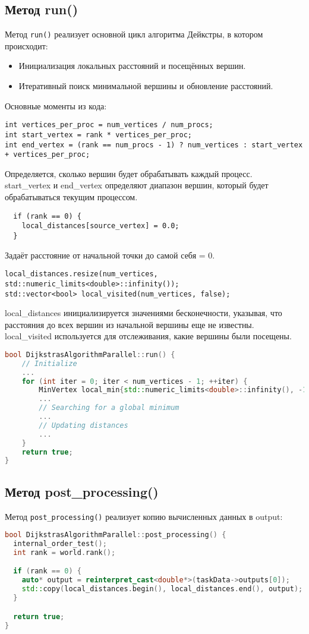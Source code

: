 \documentclass[12pt]{article}
\begin{document}
\subsection{Метод run()}
Метод \texttt{run()} реализует основной цикл алгоритма Дейкстры, в котором происходит:
\begin{itemize}
    \item Инициализация локальных расстояний и посещённых вершин.
    \item Итеративный поиск минимальной вершины и обновление расстояний.
\end{itemize}
Основные моменты из кода:
\begin{lstlisting}
int vertices_per_proc = num_vertices / num_procs;
int start_vertex = rank * vertices_per_proc;
int end_vertex = (rank == num_procs - 1) ? num_vertices : start_vertex + vertices_per_proc;
\end{lstlisting}
Определяется, сколько вершин будет обрабатывать каждый процесс.\\
start\_vertex и end\_vertex определяют диапазон вершин, который будет обрабатываться текущим процессом.
\begin{lstlisting}
  if (rank == 0) {
    local_distances[source_vertex] = 0.0;
  }
\end{lstlisting}
Задаёт расстояние от начальной точки до самой себя = 0.
\begin{lstlisting}
local_distances.resize(num_vertices, std::numeric_limits<double>::infinity());
std::vector<bool> local_visited(num_vertices, false);
\end{lstlisting}
local\_distances инициализируется значениями бесконечности, указывая, что расстояния до всех вершин из начальной вершины еще не известны.\\
local\_visited используется для отслеживания, какие вершины были посещены.
\begin{lstlisting}[language=c++, caption={Основной цикл, где происходит поиск минимума}]
bool DijkstrasAlgorithmParallel::run() {
    // Initialize
    ...
    for (int iter = 0; iter < num_vertices - 1; ++iter) {
        MinVertex local_min{std::numeric_limits<double>::infinity(), -1};
        ...
        // Searching for a global minimum
        ...
        // Updating distances
        ...
    }
    return true;
}
\end{lstlisting}
\subsection{Метод post\_processing()}
Метод \texttt{post\_processing()} реализует копию вычисленных данных в output:
\begin{lstlisting}[language=c++, caption={Сам метод}]
bool DijkstrasAlgorithmParallel::post_processing() {
  internal_order_test();
  int rank = world.rank();

  if (rank == 0) {
    auto* output = reinterpret_cast<double*>(taskData->outputs[0]);
    std::copy(local_distances.begin(), local_distances.end(), output);
  }

  return true;
}
\end{lstlisting}
\newpage
\end{document}
